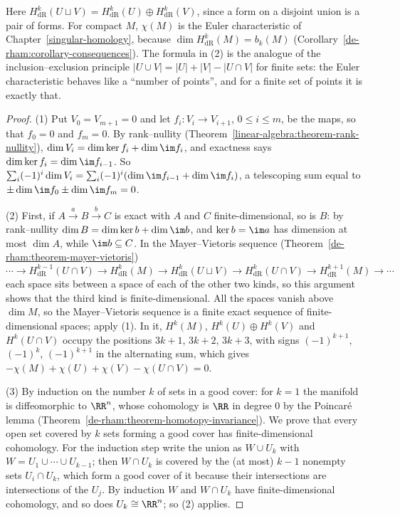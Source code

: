 Here $H^k_{\mathrm{dR}}(U \sqcup V) = H^k_{\mathrm{dR}}(U) \oplus H^k_{\mathrm{dR}}(V)$, since a form on a disjoint union is a pair of forms. For compact $M$, $\chi(M)$ is the Euler characteristic of
Chapter~\ref{singular-homology}, because $\dim H^k_{\mathrm{dR}}(M) = b_k(M)$ (Corollary~\ref{de-rham:corollary-consequences}). The formula in (2) is the analogue of the inclusion--exclusion principle
$|U \cup V| = |U| + |V| - |U \cap V|$ for finite sets: the Euler characteristic behaves like a ``number of points'', and for a finite set of points it is exactly that.

\begin{proof}
(1) Put $V_0 = V_{m+1} = 0$ and let $f_i \colon V_i \to V_{i+1}$, $0 \leq i \leq m$, be the maps, so that $f_0 = 0$ and $f_m = 0$. By rank--nullity (Theorem~\ref{linear-algebra:theorem-rank-nullity}), $\dim V_i = \dim\ker f_i + \dim\im f_i$, and exactness says
$\dim\ker f_i = \dim\im f_{i-1}$. So $\sum_i(-1)^i\dim V_i = \sum_i(-1)^i(\dim\im f_{i-1} + \dim\im f_i)$, a telescoping sum equal to $\pm\dim\im f_0 \pm \dim\im f_m = 0$.

(2) First, if $A \xrightarrow{a} B \xrightarrow{b} C$ is exact with $A$ and $C$ finite-dimensional, so is $B$: by rank--nullity $\dim B = \dim\ker b + \dim\im b$, and $\ker b = \im a$ has dimension at most $\dim A$,
while $\im b \subseteq C$. In the Mayer--Vietoris sequence (Theorem~\ref{de-rham:theorem-mayer-vietoris})
\[
\cdots \to H^{k-1}_{\mathrm{dR}}(U \cap V) \to H^k_{\mathrm{dR}}(M) \to H^k_{\mathrm{dR}}(U \sqcup V) \to H^k_{\mathrm{dR}}(U \cap V) \to H^{k+1}_{\mathrm{dR}}(M) \to \cdots
\]
each space sits between a space of each of the other two kinds, so this argument shows that the third kind is finite-dimensional. All the spaces vanish above $\dim M$, so the Mayer--Vietoris sequence is a finite exact
sequence of finite-dimensional spaces; apply (1). In it, $H^k(M)$, $H^k(U) \oplus H^k(V)$ and $H^k(U \cap V)$ occupy the positions $3k + 1$, $3k + 2$, $3k + 3$, with signs $(-1)^{k+1}$, $(-1)^k$, $(-1)^{k+1}$ in
the alternating sum, which gives $-\chi(M) + \chi(U) + \chi(V) - \chi(U \cap V) = 0$.

(3) By induction on the number $k$ of sets in a good cover: for $k = 1$ the manifold is diffeomorphic to $\RR^n$, whose cohomology is $\RR$ in degree $0$ by the Poincar\'e lemma
(Theorem~\ref{de-rham:theorem-homotopy-invariance}). We prove that every open set covered by $k$ sets forming a good cover has finite-dimensional cohomology. For the induction step write the union as $W \cup U_k$ with $W = U_1 \cup \cdots \cup U_{k-1}$; then
$W \cap U_k$ is covered by the (at most) $k - 1$ nonempty sets $U_i \cap U_k$, which form a good cover of it because their intersections are intersections of the $U_j$. By induction $W$ and $W \cap U_k$ have
finite-dimensional cohomology, and so does $U_k \cong \RR^n$; so (2) applies.
\end{proof}

